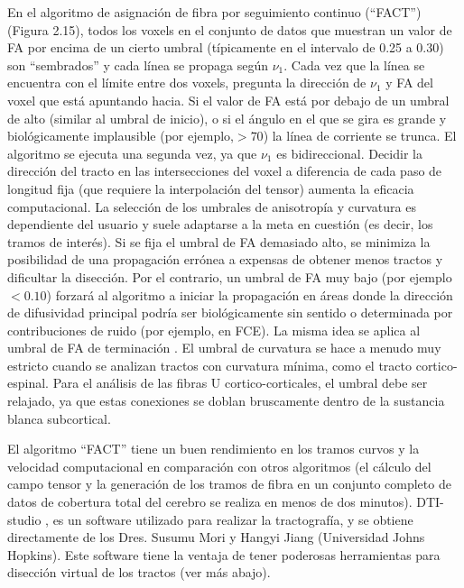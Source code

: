 \documentclass[12pt,a5,twoside]{book}
\begin{document}
En el algoritmo de asignación de fibra por seguimiento continuo (``FACT'') \citep{Mori_1999} (Figura 2.15), todos los voxels en el conjunto de datos que muestran un valor de FA por encima de un cierto umbral (típicamente en el intervalo de 0.25 a 0.30) son ``sembrados'' y cada línea se propaga según $\nu_1$. Cada vez que la línea se encuentra con el límite entre dos voxels, pregunta la dirección de $\nu_1$ y FA del voxel que está apuntando hacia. Si el valor de FA está por debajo de un umbral de alto (similar al umbral de inicio), o si el ángulo en el que se gira es grande y biológicamente implausible (por ejemplo,$>70$\textdegree{}) la línea de corriente se trunca. El algoritmo se ejecuta una segunda vez, ya que $\nu_1$ es bidireccional. Decidir la dirección del tracto en las intersecciones del voxel a diferencia de cada paso de longitud fija (que requiere la interpolación del tensor) aumenta la eficacia computacional. La selección de los umbrales de anisotropía y curvatura es dependiente del usuario y suele adaptarse a la meta en cuestión (es decir, los tramos de interés). Si se fija el umbral de FA demasiado alto, se minimiza la posibilidad de una propagación errónea a expensas de obtener menos tractos y dificultar la disección. Por el contrario, un umbral de FA muy bajo (por ejemplo $<0.10$) forzará al algoritmo a iniciar la propagación en áreas donde la dirección de difusividad principal podría ser biológicamente sin sentido o determinada por contribuciones de ruido (por ejemplo, en FCE). La misma idea se aplica al umbral de FA de terminación \citep{Mori_2002,Dauguet_2007}. El umbral de curvatura se hace a menudo muy estricto cuando se analizan tractos con curvatura mínima, como el tracto cortico-espinal. Para el análisis de las fibras U cortico-corticales, el umbral debe ser relajado, ya que estas conexiones se doblan bruscamente dentro de la sustancia blanca subcortical.

El algoritmo ``FACT'' tiene un buen rendimiento en los tramos curvos y la velocidad computacional en comparación con otros algoritmos \citep{Lazar_2003} (el cálculo del campo tensor y la generación de los tramos de fibra en un conjunto completo de datos de cobertura total del cerebro se realiza en menos de dos minutos). DTI-studio \citep{Jiang_2006}, es un software utilizado para realizar la tractografía, y se obtiene directamente de los Dres. Susumu Mori y Hangyi Jiang (Universidad Johns Hopkins). Este software tiene la ventaja de tener poderosas herramientas para disección virtual de los tractos (ver más abajo).
\end{document}
